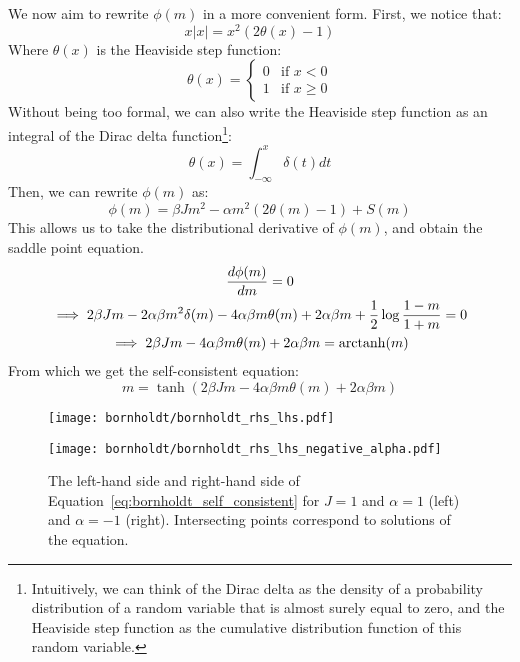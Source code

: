 We now aim to rewrite $\phi(m)$ in a more convenient form. First, we notice that:
\begin{equation}
    x|x| = x^2 (2\theta(x)-1)
\end{equation}
Where $\theta(x)$ is the Heaviside step function:
\begin{equation}
    \theta(x) = \begin{cases}
        0 & \text{if } x < 0\\
        1 & \text{if } x \geq 0
    \end{cases}
\end{equation}
Without being too formal, we can also write the Heaviside step function as an integral of the Dirac delta function\footnote{Intuitively, we can think of the Dirac delta as the density of a probability distribution of a random variable that is almost surely equal to zero, and the Heaviside step function as the cumulative distribution function of this random variable.}:
\begin{equation}
    \theta(x) = \int_{-\infty}^{x} \delta(t) dt
\end{equation}
Then, we can rewrite $\phi(m)$ as:
\begin{equation}
    \phi(m) = \beta J m^2 - \alpha m^2 (2\theta(m)-1) + S(m)
\end{equation}
This allows us to take the distributional derivative of $\phi(m)$, and obtain the saddle point equation.
\begin{equation}
    \begin{gathered}
        \frac{d \phi(m)}{d m} = 0\\
        \implies 2\beta J m - 2 \alpha \beta m^2 \delta(m) - 4 \alpha \beta m \theta(m) + 2\alpha \beta m + \frac{1}{2} \log \frac{1-m}{1+m} = 0\\
        \implies 2\beta J m - 4 \alpha \beta m \theta(m) + 2\alpha \beta m = \operatorname{arctanh}(m)\\
    \end{gathered}
\end{equation}
From which we get the self-consistent equation:
\begin{equation}
    m = \tanh\left(2\beta J m - 4 \alpha \beta m \theta(m) + 2\alpha \beta m\right)
    \label{eq:bornholdt_self_consistent}
\end{equation}
\begin{figure}[h]
    \centering
    \begin{minipage}[t]{0.45\textwidth}
        \centering
        \texttt{[image: bornholdt/bornholdt\_rhs\_lhs.pdf]}

    \end{minipage}
    \hfill
    \begin{minipage}[t]{0.45\textwidth}
        \centering
        \texttt{[image: bornholdt/bornholdt\_rhs\_lhs\_negative\_alpha.pdf]}
    \end{minipage}
    \caption{The left-hand side and right-hand side of Equation~\ref{eq:bornholdt_self_consistent} for $J=1$ and $\alpha=1$ (left) and $\alpha=-1$ (right). Intersecting points correspond to solutions of the equation.}
    \label{fig:bornholdt_rhs_lhs}
\end{figure}

